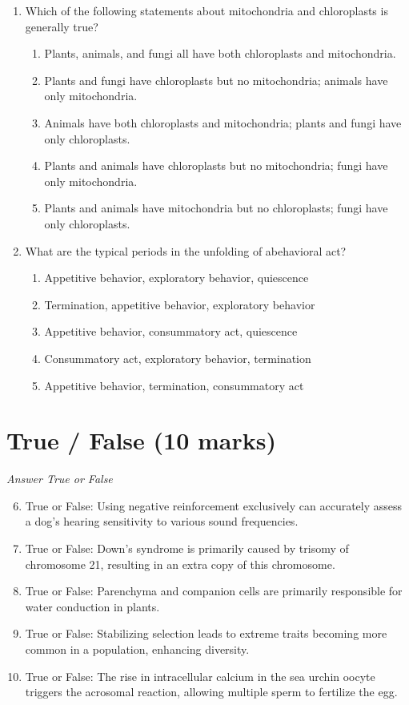 \documentclass[12pt]{article}
\begin{document}
\begin{enumerate}[label=\arabic*.]
\begin{enumerate}[label=(\alph*)]
    \item Autoradiography with labelled amino acids
    \item Through protein synthesis
\end{enumerate}
\item Which of the following statements about mitochondria and chloroplasts is generally true?
\begin{enumerate}[label=(\alph*)]
    \item Plants, animals, and fungi all have both chloroplasts and mitochondria.
    \item Plants and fungi have chloroplasts but no mitochondria; animals have only mitochondria.
    \item Animals have both chloroplasts and mitochondria; plants and fungi have only chloroplasts.
    \item Plants and animals have chloroplasts but no mitochondria; fungi have only mitochondria.
    \item Plants and animals have mitochondria but no chloroplasts; fungi have only chloroplasts.
\end{enumerate}
\item What are the typical periods in the unfolding of abehavioral act?
\begin{enumerate}[label=(\alph*)]
    \item Appetitive behavior, exploratory behavior, quiescence
    \item Termination, appetitive behavior, exploratory behavior
    \item Appetitive behavior, consummatory act, quiescence
    \item Consummatory act, exploratory behavior, termination
    \item Appetitive behavior, termination, consummatory act
\end{enumerate}
\end{enumerate}

\section*{True / False (10 marks)}
\textit{Answer True or False}
\begin{enumerate}[label=\arabic*.]
\setcounter{enumi}{5}
\item True or False: Using negative reinforcement exclusively can accurately assess a dog's hearing sensitivity to various sound frequencies.
\item True or False: Down's syndrome is primarily caused by trisomy of chromosome 21, resulting in an extra copy of this chromosome.
\item True or False: Parenchyma and companion cells are primarily responsible for water conduction in plants.
\item True or False: Stabilizing selection leads to extreme traits becoming more common in a population, enhancing diversity.
\item True or False: The rise in intracellular calcium in the sea urchin oocyte triggers the acrosomal reaction, allowing multiple sperm to fertilize the egg.
\end{enumerate}
\end{document}
